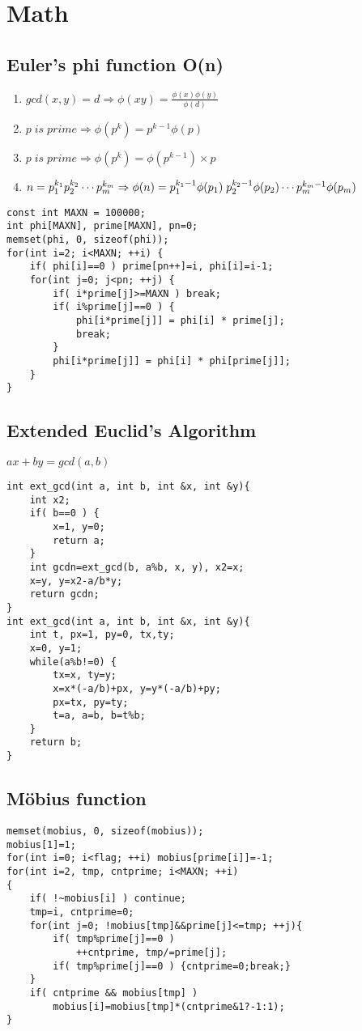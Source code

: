 \documentclass[11pt,twocolumn,a4paper]{article}
\begin{document}
\newpage
\section{Math}
\subsection{Euler's phi function O(n)}
\begin{enumerate}[1.]
\item $gcd(x,y)=d \Rightarrow \phi(xy) = \frac{\phi(x) \phi(y)}{\phi(d)}$
\item $p\; is\; prime \Rightarrow \phi(p^k) = p^{k-1} \phi(p)$
\item $p\; is\; prime \Rightarrow \phi(p^k) = \phi(p^{k-1}) \times p$
\item $n = p_{1}^{k_1} p_{2}^{k_2} \cdots p_{m}^{k_m}\\
\Rightarrow \phi(n) = p_{1}^{k_1-1}\phi(p_1)\; p_{2}^{k_2-1}\phi(p_2) \cdots p_{m}^{k_m-1}\phi(p_m)$
\end{enumerate}

\begin{lstlisting}[label=Euler's phi function O(n)]
const int MAXN = 100000;
int phi[MAXN], prime[MAXN], pn=0;
memset(phi, 0, sizeof(phi));
for(int i=2; i<MAXN; ++i) {
	if( phi[i]==0 ) prime[pn++]=i, phi[i]=i-1;
	for(int j=0; j<pn; ++j) {
		if( i*prime[j]>=MAXN ) break;
		if( i%prime[j]==0 ) {
			phi[i*prime[j]] = phi[i] * prime[j];
			break;
		}
		phi[i*prime[j]] = phi[i] * phi[prime[j]];
	}
}
\end{lstlisting}

\subsection{Extended Euclid’s Algorithm}
$ ax+by=gcd(a,b) $
\begin{lstlisting}[label=Extended Euclid’s Algorithm]
int ext_gcd(int a, int b, int &x, int &y){
	int x2;
	if( b==0 ) {
		x=1, y=0;
		return a;
	}
	int gcdn=ext_gcd(b, a%b, x, y), x2=x;
	x=y, y=x2-a/b*y;
	return gcdn;
}
int ext_gcd(int a, int b, int &x, int &y){
	int t, px=1, py=0, tx,ty;
	x=0, y=1;
	while(a%b!=0) {
		tx=x, ty=y;
		x=x*(-a/b)+px, y=y*(-a/b)+py;
		px=tx, py=ty;
		t=a, a=b, b=t%b;
	}
	return b;
}
\end{lstlisting}

\subsection{Möbius function}
\begin{lstlisting}[label=Möbius function]
memset(mobius, 0, sizeof(mobius));
mobius[1]=1;
for(int i=0; i<flag; ++i) mobius[prime[i]]=-1;
for(int i=2, tmp, cntprime; i<MAXN; ++i)
{
	if( !~mobius[i] ) continue;
	tmp=i, cntprime=0;
	for(int j=0; !mobius[tmp]&&prime[j]<=tmp; ++j){
		if( tmp%prime[j]==0 )
			++cntprime, tmp/=prime[j];
		if( tmp%prime[j]==0 ) {cntprime=0;break;}
	}
	if( cntprime && mobius[tmp] )
		mobius[i]=mobius[tmp]*(cntprime&1?-1:1);
}
\end{lstlisting}
\end{document}
